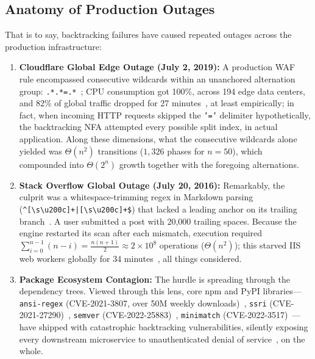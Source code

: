 \documentclass{ieeeaccess}
\begin{document}
\subsection{Anatomy of Production Outages}
That is to say, backtracking failures have caused repeated outages across the production infrastructure:
\begin{enumerate}
    \item \textbf{Cloudflare Global Edge Outage (July 2, 2019):} A production WAF rule encompassed consecutive wildcards within an unanchored alternation group: \texttt{.*.*=.*}~\cite{davis2021memoization,cloudflare2019outage}; CPU consumption got 100\%, across 194 edge data centers, and 82\% of global traffic dropped for 27 minutes~\cite{cloudflare2019outage}, at least empirically; in fact, when incoming HTTP requests skipped the \texttt{'='} delimiter hypothetically, the backtracking NFA attempted every possible split index, in actual application. Along these dimensions, what the consecutive wildcards alone yielded was $\Theta(n^2)$ transitions ($1{,}326$ phases for $n=50$), which compounded into $\Theta(2^n)$ growth together with the foregoing alternations.
    \item \textbf{Stack Overflow Global Outage (July 20, 2016):} Remarkably, the culprit was a whitespace-trimming regex in Markdown parsing (\texttt{\^{}[\textbackslash s\textbackslash u200c]+|[\textbackslash s\textbackslash u200c]+\$}) that lacked a leading anchor on its trailing branch~\cite{stackoverflow2016outage}. A user submitted a post with 20,000 trailing spaces. Because the engine restarted its scan after each mismatch, execution required $\sum_{i=0}^{n-1}(n-i) = \frac{n(n+1)}{2} \approx 2 \times 10^8$ operations ($\Theta(n^2)$); this starved IIS web workers globally for 34 minutes~\cite{staicu2018freezing,stackoverflow2016outage}, all things considered.
    \item \textbf{Package Ecosystem Contagion:} The hurdle is spreading through the dependency trees. Viewed through this lens, core npm and PyPI libraries---\texttt{ansi-regex} (CVE-2021-3807, over 50M weekly downloads)~\cite{cve_2021_3807}, \texttt{ssri} (CVE-2021-27290)~\cite{cve_2021_27290}, \texttt{semver} (CVE-2022-25883)~\cite{cve_2022_25883}, \texttt{minimatch} (CVE-2022-3517)~\cite{cve_2022_3517}---have shipped with catastrophic backtracking vulnerabilities, silently exposing every downstream microservice to unauthenticated denial of service~\cite{davis2019lingua,davis2021memoization}, on the whole.
\end{enumerate}
\end{document}
